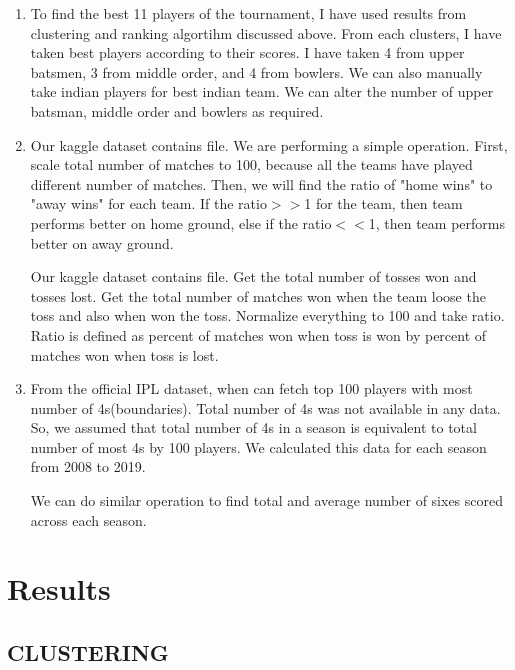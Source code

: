 \documentclass[12pt]{article}
\newcommand{\codebox}[1]{%
	\colorbox{codecolor}{\ttfamily \detokenize{#1}}%
}
\begin{document}
\begin{enumerate}
	\item To find the best 11 players of the tournament, I have used results from clustering and ranking algortihm discussed above. From each clusters, I have taken best players according to their scores. I have taken 4 from upper batsmen, 3 from middle order, and 4 from bowlers. We can also manually take indian players for best indian team. We can alter the number of upper batsman, middle order and bowlers as required.
	
	\item Our kaggle dataset contains \codebox{teamwise_home_and_away.csv} file. We are performing a simple operation. First, scale total number of matches to 100, because all the teams have played different number of matches. Then, we will find the ratio of "home wins" to "away wins" for each team. If the ratio$>>$1 for the team, then team performs better on home ground, else if the ratio$<<$1, then team performs better on away ground.
	
	Our kaggle dataset contains \codebox{teams.csv} file. Get the total number of tosses won and tosses lost. Get the total number of matches won when the team loose the toss and also when won the toss. Normalize everything to 100 and take ratio. Ratio is defined as percent of matches won when toss is won by percent of matches won when toss is lost.
	
	\item From the official IPL dataset, when can fetch top 100 players with most number of 4s(boundaries). Total number of 4s was not available in any data. So, we assumed that total number of 4s in a season is equivalent to total number of most 4s by 100 players. We calculated this data for each season from 2008 to 2019.
	
	We can do similar operation to find total and average number of sixes scored across each season.
	
\end{enumerate}




\newpage
\section*{Results}

\subsection*{CLUSTERING}
\end{document}
